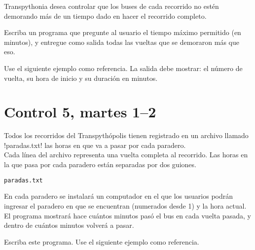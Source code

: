 \documentclass[12pt,spanish,a5paper,landscape]{article}
\begin{document}
  Transpythonia desea controlar que los buses de cada recorrido
  no estén demorando más de un tiempo dado
  en hacer el recorrido completo.

  Escriba un programa que pregunte al usuario
  el tiempo máximo permitido (en minutos),
  y entregue como salida todas las vueltas
  que se demoraron más que eso.

  Use el siguiente ejemplo como referencia.
  La salida debe mostrar:
  el número de vuelta,
  su hora de inicio
  y su duración en minutos.

  \begin{minipage}[t]{0.6\textwidth}
    
  \end{minipage}

  \newpage

  \part*{Control 5, martes 1--2}
  \newpage

  \begin{minipage}[t]{0.45\textwidth}
    Todos los recorridos del Transpythópolis
    tienen registrado en un archivo llamado \li!paradas.txt!
    las horas en que va a pasar por cada paradero.
    \\[2ex]
    Cada línea del archivo representa
    una vuelta completa al recorrido.
    Las horas en la que pasa por cada paradero
    están separadas por dos guiones.
  \end{minipage}
  \hfill
  \begin{minipage}[t]{0.45\textwidth}
    \hfil\verb!paradas.txt!\hfil
    \small
    
  \end{minipage}

  En cada paradero se instalará un computador
  en el que los usuarios podrán ingresar
  el paradero en que se encuentran (numerados desde 1)
  y la hora actual.
  El programa mostrará
  hace cuántos minutos pasó el bus en cada vuelta pasada,
  y dentro de cuántos minutos volverá a pasar.

  Escriba este programa.
  Use el siguiente ejemplo como referencia.

  \begin{minipage}[t]{0.6\textwidth}
    
  \end{minipage}

  \newpage
\end{document}
